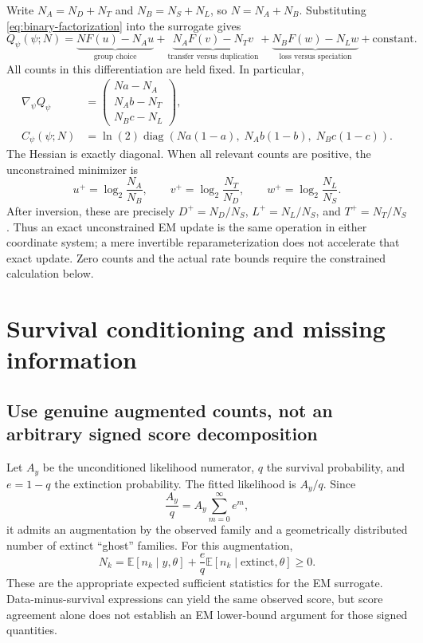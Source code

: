 \documentclass[11pt]{article}
\newcommand{\E}{\mathbb{E}}
\newcommand{\diag}{\operatorname{diag}}
\begin{document}
Write $N_A=N_D+N_T$ and $N_B=N_S+N_L$, so $N=N_A+N_B$. Substituting
\eqref{eq:binary-factorization} into the surrogate gives
\begin{equation}
 Q_\psi(\psi;N)
 =\underbrace{NF(u)-N_Au}_{\text{group choice}}
 +\underbrace{N_AF(v)-N_Tv}_{\text{transfer versus duplication}}
 +\underbrace{N_BF(w)-N_Lw}_{\text{loss versus speciation}}
 +\text{constant}.
 \label{eq:surrogate-hierarchy}
\end{equation}
All counts in this differentiation are held fixed. In particular,
\begin{align}
 \nabla_\psi Q_\psi
 &=\begin{pmatrix}Na-N_A\\N_Ab-N_T\\N_Bc-N_L\end{pmatrix},
 \label{eq:hierarchical-gradient}\\
 C_\psi(\psi;N)
 &=\ln(2)\diag\!\left(Na(1-a),\;N_Ab(1-b),\;N_Bc(1-c)\right).
 \label{eq:hierarchical-curvature}
\end{align}
The Hessian is exactly diagonal. When all relevant counts are positive, the
unconstrained minimizer is
\begin{equation}
 u^+=\log_2\frac{N_A}{N_B},\qquad
 v^+=\log_2\frac{N_T}{N_D},\qquad
 w^+=\log_2\frac{N_L}{N_S}.
 \label{eq:hierarchical-em}
\end{equation}
After inversion, these are precisely $D^+=N_D/N_S$, $L^+=N_L/N_S$, and
$T^+=N_T/N_S$. Thus an exact unconstrained EM update is the same operation in
either coordinate system; a mere invertible reparameterization does not
accelerate that exact update. Zero counts and the actual rate bounds require
the constrained calculation below.

\section{Survival conditioning and missing information}

\subsection{Use genuine augmented counts, not an arbitrary signed score decomposition}

Let $A_y$ be the unconditioned likelihood numerator, $q$ the survival probability,
and $e=1-q$ the extinction probability. The fitted likelihood is $A_y/q$. Since
\[
 \frac{A_y}{q}=A_y\sum_{m=0}^{\infty}e^m,
\]
it admits an augmentation by the observed family and a geometrically distributed
number of extinct ``ghost'' families. For this augmentation,
\begin{equation}
 N_k=\E[n_k\mid y,\theta]
       +\frac{e}{q}\E[n_k\mid\text{extinct},\theta]\geq0.
 \label{eq:ghost-counts}
\end{equation}
These are the appropriate expected sufficient statistics for the EM surrogate.
Data-minus-survival expressions can yield the same observed score, but score
agreement alone does not establish an EM lower-bound argument for those signed
quantities.
\end{document}
